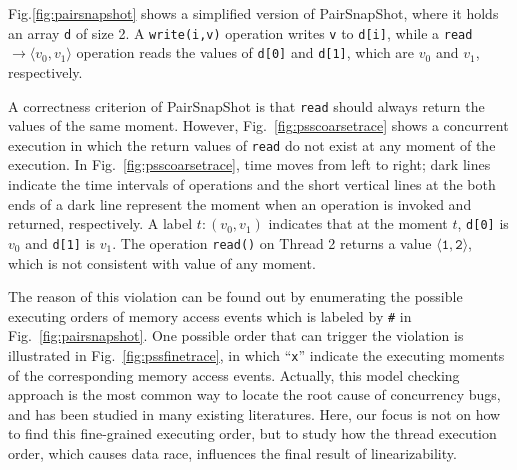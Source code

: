 \documentclass[runningheads]{llncs}
\newcommand{\pair}[1]{{\langle{#1}\rangle}}
\begin{document}
Fig.\ref{fig:pairsnapshot} shows a simplified version of PairSnapShot, where it holds an array \texttt{d} of size 2. A \texttt{write(i,v)} operation writes \texttt{v} to \texttt{d[i]}, while a \texttt{read} \texttt{$\to \langle v_0,v_1\rangle$} operation reads the values of \texttt{d[0]} and \texttt{d[1]}, which are $v_0$ and $v_1$, respectively.

 A correctness criterion of PairSnapShot is that \texttt{read} should always return the values of the same moment. However, 
Fig.~\ref{fig:psscoarsetrace} shows a concurrent execution in which the return values of \texttt{read} do not exist at any moment of the execution. 
In Fig.~\ref{fig:psscoarsetrace}, time moves from left to right; dark lines indicate the time intervals of operations and  
the short vertical lines at the both ends of a dark line represent the moment when an operation is invoked and returned, respectively.
A label ${t:(v_0,v_1)}$ indicates that at the moment $t$,  \texttt{d[0]} is $v_0$ and \texttt{d[1]} is $v_1$.
  The operation \texttt{read()} on Thread 2 returns a value $\mathtt{\pair{1,2}}$,
  which is not consistent with value of any moment. 

The reason of this violation can be found out by enumerating the possible executing orders of memory access events which is labeled by \texttt{\#} in Fig.~\ref{fig:pairsnapshot}. 
One possible order that can trigger the violation is illustrated in Fig.~\ref{fig:pssfinetrace}, in which ``\texttt{x}'' indicate the executing moments of the corresponding memory access events. 
Actually, this model checking approach is the most common way to locate the root cause of concurrency bugs, and has been studied in many existing literatures.
Here, our focus is not on how to find this fine-grained executing order, but to study how the thread execution order, which causes data race, influences the final result of linearizability.

\end{document}
